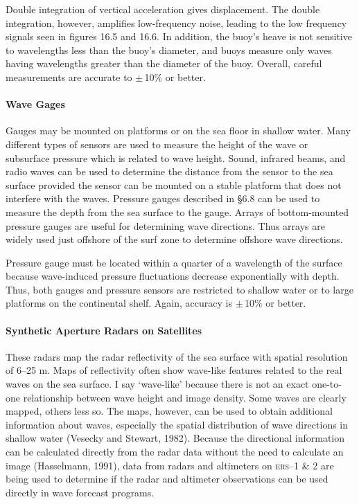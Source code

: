 Double integration of vertical acceleration gives displacement. The
double integration, however, amplifies low-frequency noise, leading to
the low frequency signals seen in figures 16.5 and 16.6. In addition,
the buoy's heave is not sensitive to wavelengths less than the buoy's
diameter, and buoys measure only waves having wavelengths greater than
the diameter of the buoy. Overall, careful measurements are accurate
to $\pm \,$10\% or better.

\paragraph{Wave Gages}
Gauges may be mounted on platforms or on the sea floor in
shallow water. Many different types
of sensors are used to measure the height of the wave or subsurface
pressure which is related to wave height. Sound, infrared beams, and
radio waves can be used to determine the distance from the sensor to
the sea surface provided the sensor can be mounted on a stable
platform that does not interfere with the waves. Pressure gauges
described in \S 6.8 can be used to measure the depth from the sea
surface to the gauge. Arrays of bottom-mounted pressure gauges are
useful for determining wave directions. Thus arrays are widely used
just offshore of the surf zone to determine offshore wave directions.

Pressure gauge must be located within a quarter of a wavelength of the
surface because wave-induced pressure fluctuations decrease
exponentially with depth. Thus, both gauges and pressure sensors are
restricted to shallow water or to large platforms on the continental
shelf. Again, accuracy is $\pm \,$10\% or
better.


\paragraph{Synthetic Aperture Radars on Satellites}
These radars map the radar reflectivity of the sea surface with spatial resolution
of 6--25 m. Maps of reflectivity often show wave-like features related
to the real waves on the sea surface. I say `wave-like' because there
is not an exact one-to-one relationship between wave height and image
density. Some waves are clearly mapped, others less so. The maps,
however, can be used to obtain additional information about waves,
especially the spatial distribution of wave directions in shallow
water (Vesecky and Stewart, 1982). Because the directional information
can be calculated directly from the radar data without the need to
calculate an image (Hasselmann, 1991), data from radars and altimeters
on \textsc{ers}--1 \& 2 are being used to
determine if the radar and altimeter observations can be used directly
in wave forecast programs.

